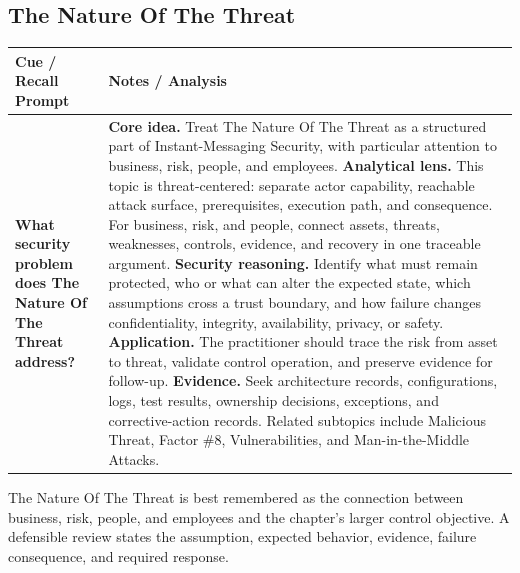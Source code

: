 \documentclass[11pt]{article}
\newcommand{\CornellHeader}{%
\rowcolor{Navy}\color{white}\bfseries Cue / Recall Prompt & \color{white}\bfseries Notes / Analysis\\\hline}
\newcommand{\CornellRow}[2]{%
\cellcolor{CueGray}\RaggedRight\textbf{#1} & \RaggedRight #2\\\hline}
\begin{document}
\subsection*{The Nature Of The Threat}
\begin{longtable}{>{\RaggedRight\arraybackslash}p{}|>{\RaggedRight\arraybackslash}p{}}
\CornellHeader
\CornellRow{What security problem does The Nature Of The Threat address?}{\textbf{Core idea.} Treat The Nature Of The Threat as a structured part of Instant-Messaging Security, with particular attention to business, risk, people, and employees. \textbf{Analytical lens.} This topic is threat-centered: separate actor capability, reachable attack surface, prerequisites, execution path, and consequence. For business, risk, and people, connect assets, threats, weaknesses, controls, evidence, and recovery in one traceable argument. \textbf{Security reasoning.} Identify what must remain protected, who or what can alter the expected state, which assumptions cross a trust boundary, and how failure changes confidentiality, integrity, availability, privacy, or safety. \textbf{Application.} The practitioner should trace the risk from asset to threat, validate control operation, and preserve evidence for follow-up. \textbf{Evidence.} Seek architecture records, configurations, logs, test results, ownership decisions, exceptions, and corrective-action records. Related subtopics include Malicious Threat, Factor \#8, Vulnerabilities, and Man-in-the-Middle Attacks.}
\end{longtable}
\begin{topicsummary}
The Nature Of The Threat is best remembered as the connection between business, risk, people, and employees and the chapter's larger control objective. A defensible review states the assumption, expected behavior, evidence, failure consequence, and required response.
\end{topicsummary}
\end{document}

